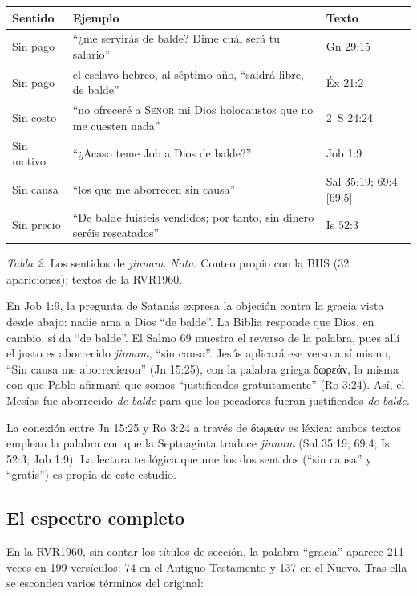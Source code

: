 \documentclass[11pt,letterpaper]{article}
\newcommand{\grc}[1]{\foreignlanguage{ancientgreek}{#1}}
\newcommand{\SENOR}{\textsc{Señor}}
\begin{document}
\begin{center}\small\renewcommand{\arraystretch}{1.2}
\begin{tabular}{@{}L{3.2cm}L{7.4cm}L{3.8cm}@{}}
\toprule
\textbf{Sentido} & \textbf{Ejemplo} & \textbf{Texto} \\ \midrule
Sin pago & ``¿me servirás de balde? Dime cuál será tu salario'' & Gn 29:15 \\
Sin pago & el esclavo hebreo, al séptimo año, ``saldrá libre, de balde'' & Éx 21:2 \\
Sin costo & ``no ofreceré a \SENOR{} mi Dios holocaustos que no me cuesten nada'' & 2~S 24:24 \\
Sin motivo & ``¿Acaso teme Job a Dios de balde?'' & Job 1:9 \\
Sin causa & ``los que me aborrecen sin causa'' & Sal 35:19; 69:4 [69:5] \\
Sin precio & ``De balde fuisteis vendidos; por tanto, sin dinero seréis rescatados'' & Is 52:3 \\
\bottomrule
\end{tabular}\par
{\footnotesize\color{gris}\textit{Tabla 2.} Los sentidos de \emph{jinnam}. \textit{Nota.} Conteo propio con la BHS (32 apariciones); textos de la RVR1960.}
\end{center}

En Job 1:9, la pregunta de Satanás expresa la objeción contra la gracia vista desde abajo: nadie ama a Dios ``de balde''. La Biblia responde que Dios, en cambio, sí da ``de balde''. El Salmo 69 muestra el reverso de la palabra, pues allí el justo es aborrecido \emph{jinnam}, ``sin causa''. Jesús aplicará ese verso a sí mismo, ``Sin causa me aborrecieron'' (Jn 15:25), con la palabra griega \grc{δωρεάν}, la misma con que Pablo afirmará que somos ``justificados gratuitamente'' (Ro 3:24). Así, el Mesías fue aborrecido \emph{de balde} para que los pecadores fueran justificados \emph{de balde}.

\begin{nota}[Precisión]
La conexión entre Jn 15:25 y Ro 3:24 a través de \grc{δωρεάν} es léxica: ambos textos emplean la palabra con que la Septuaginta traduce \emph{jinnam} (Sal 35:19; 69:4; Is 52:3; Job 1:9). La lectura teológica que une los dos sentidos (``sin causa'' y ``gratis'') es propia de este estudio.
\end{nota}

\subsection{El espectro completo}
En la RVR1960, sin contar los títulos de sección, la palabra ``gracia'' aparece 211 veces en 199 versículos: 74 en el Antiguo Testamento y 137 en el Nuevo. Tras ella se esconden varios términos del original:
\end{document}
